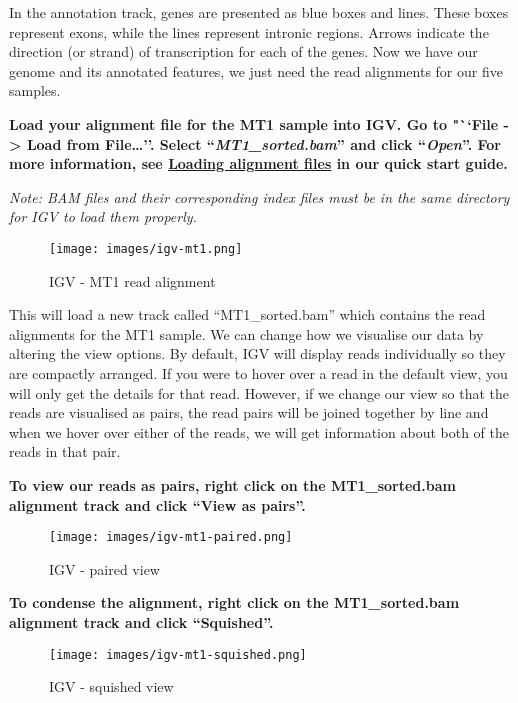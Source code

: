 \documentclass[11pt]{article}
\begin{document}
    In the annotation track, genes are presented as blue boxes and lines.
These boxes represent exons, while the lines represent intronic regions.
Arrows indicate the direction (or strand) of transcription for each of
the genes. Now we have our genome and its annotated features, we just
need the read alignments for our five samples.

\newpage


\textbf{Load your alignment file for the MT1 sample into IGV. Go to
"``File -\textgreater{} Load from File\ldots{}''. Select
``\textit{MT1\_sorted.bam}'' and click ``\textit{Open}''. For more
information, see
\href{https://github.com/sanger-pathogens/pathogen-informatics-training/blob/master/Notebooks/IGV/index.ipynb}{Loading
alignment files} in our quick start guide.}

\textit{Note: BAM files and their corresponding index files must be in the
same directory for IGV to load them properly.}

    \begin{figure}[!h]
\centering
\texttt{[image: images/igv-mt1.png]}
\caption{IGV - MT1 read alignment}
\end{figure}

    This will load a new track called ``MT1\_sorted.bam'' which contains the
read alignments for the MT1 sample. We can change how we visualise our
data by altering the view options. By default, IGV will display reads
individually so they are compactly arranged. If you were to hover over a
read in the default view, you will only get the details for that read.
However, if we change our view so that the reads are visualised as
pairs, the read pairs will be joined together by line and when we hover
over either of the reads, we will get information about both of the
reads in that pair.

    \textbf{To view our reads as pairs, right click on the MT1\_sorted.bam
alignment track and click ``View as pairs''.}

    \begin{figure}[!h]
\centering
\texttt{[image: images/igv-mt1-paired.png]}
\caption{IGV - paired view}
\end{figure}

\newpage


    \textbf{To condense the alignment, right click on the MT1\_sorted.bam
alignment track and click ``Squished''.}

    \begin{figure}[!h]
\centering
\texttt{[image: images/igv-mt1-squished.png]}
\caption{IGV - squished view}
\end{figure}
\end{document}
